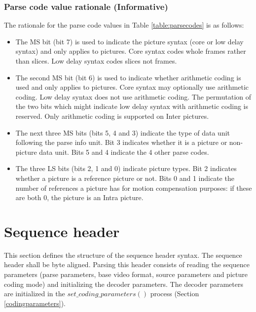 \begin{informative*}
\subsubsection{Parse code value rationale (Informative)}

The rationale for the parse code values in Table \ref{table:parsecodes} is as follows:
\begin{itemize}
\item The MS bit (bit 7) is used to indicate the picture syntax (core or low delay syntax) 
and only applies to pictures. Core syntax codes whole frames rather than slices. Low delay syntax codes slices not frames. 
\item The second MS bit (bit 6) is used to indicate whether arithmetic coding is used and
only applies to pictures. Core syntax may optionally use arithmetic coding. Low delay
syntax does not use arithmetic coding. The permutation of the two bits which
might indicate low delay syntax with arithmetic coding is reserved. Only arithmetic coding is supported on
Inter pictures.
\item The next three MS bits (bits 5, 4 and 3) indicate the type of data unit following the parse info unit. Bit 3 indicates whether it is a picture or non-picture data unit. Bits 5 and 4 indicate the 4 other parse codes.
\item The three LS bits (bits 2, 1 and 0) indicate picture types. Bit 2 indicates whether a picture
is a reference picture or not. Bits 0 and 1 indicate the number of references a picture has
for motion compensation purposes: if these are both 0, the picture is an Intra picture.
\end{itemize}

\end{informative*}

\clearpage
\section{Sequence header}
\label{sequenceheader}

This section defines the structure of the sequence header syntax. 
The sequence header shall be byte aligned. 
Parsing this header consists of reading the sequence parameters 
(parse parameters, base video format, source parameters and 
picture coding mode) and initializing the decoder parameters. The decoder 
parameters are initialized in the $set\_coding\_parameters()$ process (Section 
\ref{codingparameters}).

